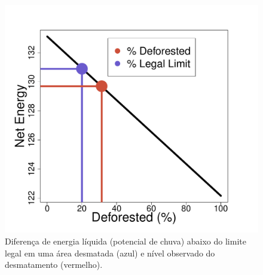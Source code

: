 \documentclass[DIV=calc, paper=a4, fontsize=11pt,twocolumn,margin=.5in]{scrartcl}	 %
\begin{document}
\begin{figure}[h]
\vspace{-1em}
  \includegraphics[width=1\linewidth]{Rnet_rec.pdf}
\vspace{-2em}
 \caption{Diferença de energia l\'iquida (potencial de chuva) abaixo do limite legal em uma \'area desmatada (azul) e n\'ivel observado do desmatamento (vermelho). }
  \label{fig:deforest}
\end{figure}
 





\vspace{-1em}
{\scriptsize }

\end{document}
